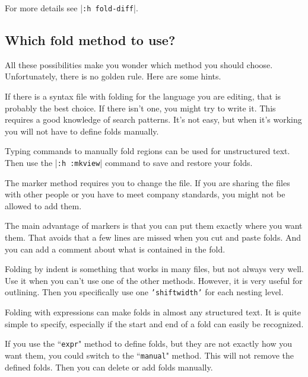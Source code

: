 For more details see |\texttt{:h fold-diff}|.
\subsection{Which fold method to use?}
All these possibilities make you wonder which method you should choose.
Unfortunately, there is no golden rule.
Here are some hints.

If there is a syntax file with folding for the language you are editing, that is probably the best choice.
If there isn't one, you might try to write it.
This requires a good knowledge of search patterns.
It's not easy, but when it's working you will not have to define folds manually.

Typing commands to manually fold regions can be used for unstructured text.
Then use the |\texttt{:h :mkview}| command to save and restore your folds.

The marker method requires you to change the file.
If you are sharing the files with other people or you have to meet company standards, you might not be allowed to add them.

The main advantage of markers is that you can put them exactly where you want them.
That avoids that a few lines are missed when you cut and paste folds.
And you can add a comment about what is contained in the fold.

Folding by indent is something that works in many files, but not always very well.
Use it when you can't use one of the other methods.
However, it is very useful for outlining.
Then you specifically use one \texttt{'shiftwidth'} for each nesting level.

Folding with expressions can make folds in almost any structured text.
It is quite simple to specify, especially if the start and end of a fold can easily be recognized.

If you use the ``\texttt{expr}" method to define folds, but they are not exactly how you want them, you could switch to the ``\texttt{manual}" method.
This will not remove the defined folds.
Then you can delete or add folds manually.
\clearpage
